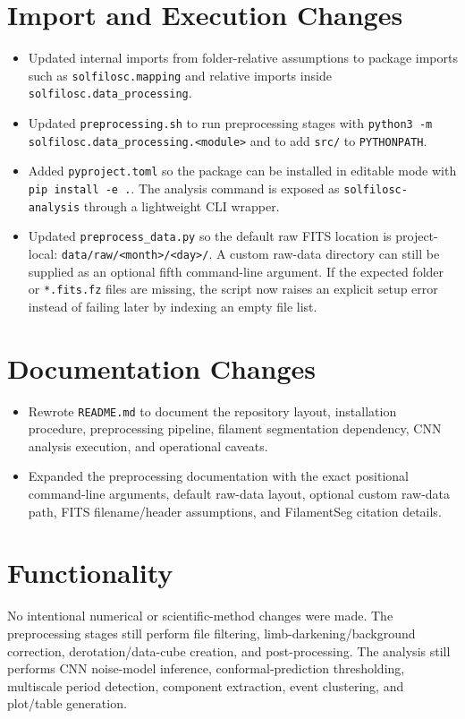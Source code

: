 \documentclass{article}
\begin{document}
\section{Import and Execution Changes}
\begin{itemize}[leftmargin=*]
  \item Updated internal imports from folder-relative assumptions to package
  imports such as \texttt{solfilosc.mapping} and relative imports inside
  \texttt{solfilosc.data\_processing}.
  \item Updated \texttt{preprocessing.sh} to run preprocessing stages with
  \texttt{python3 -m solfilosc.data\_processing.<module>} and to add
  \texttt{src/} to \texttt{PYTHONPATH}.
  \item Added \texttt{pyproject.toml} so the package can be installed in
  editable mode with \texttt{pip install -e .}. The analysis command is
  exposed as \texttt{solfilosc-analysis} through a lightweight CLI wrapper.
  \item Updated \texttt{preprocess\_data.py} so the default raw FITS location
  is project-local: \texttt{data/raw/<month>/<day>/}. A custom raw-data
  directory can still be supplied as an optional fifth command-line argument.
  If the expected folder or \texttt{*.fits.fz} files are missing, the script
  now raises an explicit setup error instead of failing later by indexing an
  empty file list.
\end{itemize}

\section{Documentation Changes}
\begin{itemize}[leftmargin=*]
  \item Rewrote \texttt{README.md} to document the repository layout,
  installation procedure, preprocessing pipeline, filament segmentation
  dependency, CNN analysis execution, and operational caveats.
  \item Expanded the preprocessing documentation with the exact positional
  command-line arguments, default raw-data layout, optional custom raw-data
  path, FITS filename/header assumptions, and FilamentSeg citation details.
\end{itemize}

\section{Functionality}
No intentional numerical or scientific-method changes were made. The
preprocessing stages still perform file filtering, limb-darkening/background
correction, derotation/data-cube creation, and post-processing. The analysis
still performs CNN noise-model inference, conformal-prediction thresholding,
multiscale period detection, component extraction, event clustering, and
plot/table generation.
\end{document}
